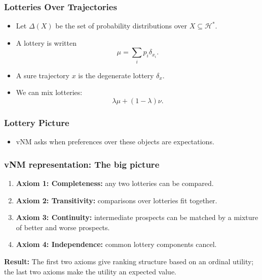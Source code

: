 \documentclass[10pt,a4paper]{beamer}
\newcommand{\Hcal}{\mathcal{H}}
\newcommand{\Lot}{\Delta}
\begin{document}
\begin{frame}
\frametitle{Lotteries Over Trajectories}
\begin{itemize}
    \item Let $\Lot(X)$ be the set of probability distributions over
    $X\subseteq \Hcal^*$.
    \pause
    \item A lottery is written
    $$
    \mu=\sum_i p_i\delta_{x_i}.
    $$
    \pause
    \item A sure trajectory $x$ is the degenerate lottery $\delta_x$.
    \pause
    \item We can mix lotteries:
    $$
    \lambda\mu+(1-\lambda)\nu.
    $$
\end{itemize}
\end{frame}

\begin{frame}
\frametitle{Lottery Picture}
\centering
{}

\vspace{0.55cm}
\begin{itemize}
    \item vNM asks when preferences over these objects are expectations.
\end{itemize}
\end{frame}

\begin{frame}
\frametitle{vNM representation: The big picture}
\begin{enumerate}
    \item \textbf{Axiom 1: Completeness:} any two lotteries can be compared.
    \pause
    \item \textbf{Axiom 2: Transitivity:} comparisons over lotteries fit together.
    \pause
    \item \textbf{Axiom 3: Continuity:} intermediate prospects can be matched by a
    mixture of better and worse prospects.
    \pause
    \item \textbf{Axiom 4: Independence:} common lottery components cancel.
\end{enumerate}

\pause
\vspace{0.25cm}
\textbf{Result:}
The first two axioms give ranking structure based on an ordinal utility;
the last two axioms make the utility an expected value.
\end{frame}
\end{document}
